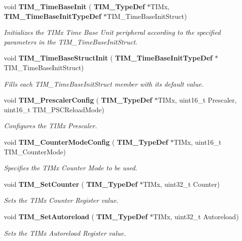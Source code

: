 \begin{DoxyCompactItemize}
void \textbf{ T\+I\+M\+\_\+\+Time\+Base\+Init} (\textbf{ T\+I\+M\+\_\+\+Type\+Def} $\ast$T\+I\+Mx, \textbf{ T\+I\+M\+\_\+\+Time\+Base\+Init\+Type\+Def} $\ast$T\+I\+M\+\_\+\+Time\+Base\+Init\+Struct)
\begin{DoxyCompactList}\small\item\em Initializes the T\+I\+Mx Time Base Unit peripheral according to the specified parameters in the T\+I\+M\+\_\+\+Time\+Base\+Init\+Struct. \end{DoxyCompactList}\item 
void \textbf{ T\+I\+M\+\_\+\+Time\+Base\+Struct\+Init} (\textbf{ T\+I\+M\+\_\+\+Time\+Base\+Init\+Type\+Def} $\ast$T\+I\+M\+\_\+\+Time\+Base\+Init\+Struct)
\begin{DoxyCompactList}\small\item\em Fills each T\+I\+M\+\_\+\+Time\+Base\+Init\+Struct member with its default value. \end{DoxyCompactList}\item 
void \textbf{ T\+I\+M\+\_\+\+Prescaler\+Config} (\textbf{ T\+I\+M\+\_\+\+Type\+Def} $\ast$T\+I\+Mx, uint16\+\_\+t Prescaler, uint16\+\_\+t T\+I\+M\+\_\+\+P\+S\+C\+Reload\+Mode)
\begin{DoxyCompactList}\small\item\em Configures the T\+I\+Mx Prescaler. \end{DoxyCompactList}\item 
void \textbf{ T\+I\+M\+\_\+\+Counter\+Mode\+Config} (\textbf{ T\+I\+M\+\_\+\+Type\+Def} $\ast$T\+I\+Mx, uint16\+\_\+t T\+I\+M\+\_\+\+Counter\+Mode)
\begin{DoxyCompactList}\small\item\em Specifies the T\+I\+Mx Counter Mode to be used. \end{DoxyCompactList}\item 
void \textbf{ T\+I\+M\+\_\+\+Set\+Counter} (\textbf{ T\+I\+M\+\_\+\+Type\+Def} $\ast$T\+I\+Mx, uint32\+\_\+t Counter)
\begin{DoxyCompactList}\small\item\em Sets the T\+I\+Mx Counter Register value. \end{DoxyCompactList}\item 
void \textbf{ T\+I\+M\+\_\+\+Set\+Autoreload} (\textbf{ T\+I\+M\+\_\+\+Type\+Def} $\ast$T\+I\+Mx, uint32\+\_\+t Autoreload)
\begin{DoxyCompactList}\small\item\em Sets the T\+I\+Mx Autoreload Register value. \end{DoxyCompactList}\item 

\end{DoxyCompactItemize}
